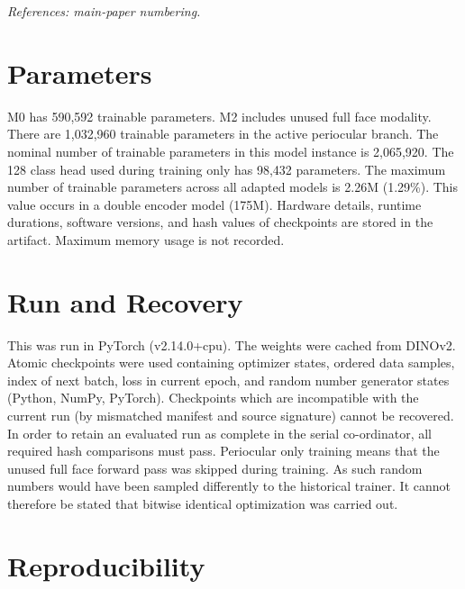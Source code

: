 \documentclass[10pt,lettersize,journal]{IEEEtran}
\begin{document}
\noindent\textit{References: main-paper numbering.}\par

\section{Parameters}

M0 has 590,592 trainable parameters. M2 includes unused full face modality. There are 1,032,960 trainable parameters in the active periocular branch. The nominal number of trainable parameters in this model instance is 2,065,920. The 128 class head used during training only has 98,432 parameters. The maximum number of trainable parameters across all adapted models is 2.26M (1.29\%). This value occurs in a double encoder model (175M). Hardware details, runtime durations, software versions, and hash values of checkpoints are stored in the artifact. Maximum memory usage is not recorded.\par

\section{Run and Recovery}

This was run in PyTorch (v2.14.0+cpu). The weights were cached from DINOv2. Atomic checkpoints were used containing optimizer states, ordered data samples, index of next batch, loss in current epoch, and random number generator states (Python, NumPy, PyTorch). Checkpoints which are incompatible with the current run (by mismatched manifest and source signature) cannot be recovered. In order to retain an evaluated run as complete in the serial co-ordinator, all required hash comparisons must pass. Periocular only training means that the unused full face forward pass was skipped during training. As such random numbers would have been sampled differently to the historical trainer. It cannot therefore be stated that bitwise identical optimization was carried out.\par

\section{Reproducibility}
\end{document}
